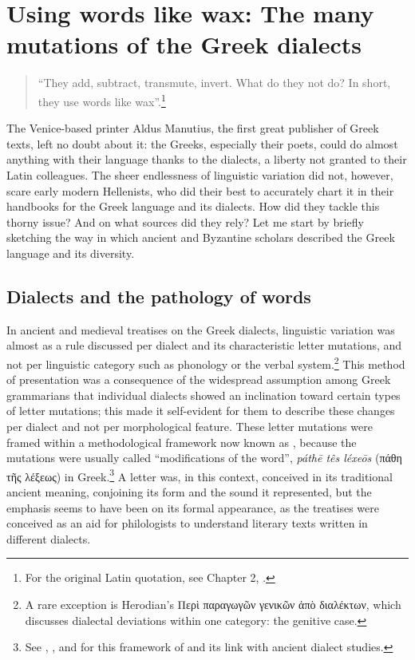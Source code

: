 \chapter{Using words like wax: The many mutations of the Greek dialects}\label{chap:6}

\begin{quote}
“They add, subtract, transmute, invert. What do they not do? In short, they use words like wax”.\footnote{{For the original Latin quotation, see Chapter 2, .}} 
\end{quote}

The Venice-based printer Aldus Manutius, the first great publisher of Greek texts, left no doubt about it: the Greeks, especially their poets, could do almost anything with their language thanks to the dialects, a liberty not granted to their Latin colleagues. The sheer endlessness of linguistic variation did not, however, scare early modern Hellenists, who did their best to accurately chart it in their handbooks for the Greek language and its dialects. How did they tackle this thorny issue? And on what sources did they rely? Let me start by briefly sketching the way in which ancient and Byzantine scholars described the Greek language and its diversity.

\section{Dialects and the pathology of words}\label{sec:6.1}

In ancient and medieval treatises on the Greek dialects, linguistic variation was almost as a rule discussed per dialect and its characteristic letter mutations, and not per linguistic category such as phonology or the verbal system.\footnote{{A rare exception is Herodian’s Περὶ παραγωγῶν γενικῶν ἀπὸ διαλέκτων, which discusses dialectal deviations within one category: the genitive case.}} This method of presentation was a consequence of the widespread assumption among Greek grammarians that individual dialects showed an inclination toward certain types of letter mutations; this made it self-evident for them to describe these changes per dialect and not per morphological feature. These letter mutations were framed within a methodological framework now known as , because the mutations were usually called “modifications of the word”, \textit{páthē tês léxeōs} (πάθη τῆς λέξεως) in Greek.\footnote{{See \citet{Wackernagel1876}, \citet[150]{Siebenborn1976}, and \citet[esp. 118]{Lallot1995} for this framework of  and its link with ancient dialect studies.}} A letter was, in this context, conceived in its traditional ancient meaning, conjoining its form and the sound it represented, but the emphasis seems to have been on its formal appearance, as the treatises were conceived as an aid for philologists to understand literary texts written in different dialects. 


